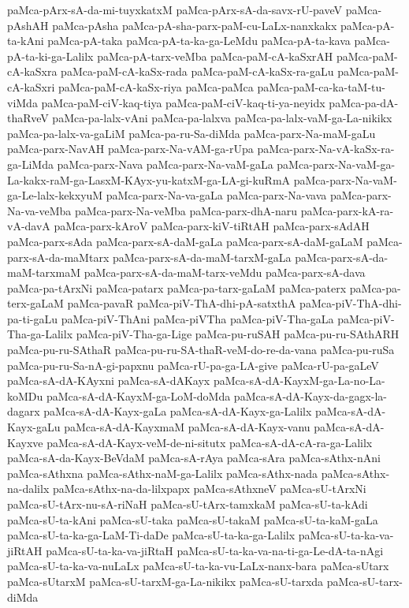 {paMca-pArx-sA-da-mi-tuyxkatxM
paMca-pArx-sA-da-savx-rU-paveV
paMca-pAshAH
paMca-pAsha
paMca-pA-sha-parx-paM-cu-LaLx-nanxkakx
paMca-pA-ta-kAni
paMca-pA-taka
paMca-pA-ta-ka-ga-LeMdu
paMca-pA-ta-kava
paMca-pA-ta-ki-ga-Lalilx
paMca-pA-tarx-veMba
paMca-paM-cA-kaSxrAH
paMca-paM-cA-kaSxra
paMca-paM-cA-kaSx-rada
paMca-paM-cA-kaSx-ra-gaLu
paMca-paM-cA-kaSxri
paMca-paM-cA-kaSx-riya
paMca-paMca
paMca-paM-ca-ka-taM-tu-viMda
paMca-paM-ciV-kaq-tiya
paMca-paM-ciV-kaq-ti-ya-neyidx
paMca-pa-dA-thaRveV
paMca-pa-lalx-vAni
paMca-pa-lalxva
paMca-pa-lalx-vaM-ga-La-nikikx
paMca-pa-lalx-va-gaLiM
paMca-pa-ru-Sa-diMda
paMca-parx-Na-maM-gaLu
paMca-parx-NavAH
paMca-parx-Na-vAM-ga-rUpa
paMca-parx-Na-vA-kaSx-ra-ga-LiMda
paMca-parx-Nava
paMca-parx-Na-vaM-gaLa
paMca-parx-Na-vaM-ga-La-kakx-raM-ga-LasxM-KAyx-yu-katxM-ga-LA-gi-kuRmA
paMca-parx-Na-vaM-ga-Le-lalx-kekxyuM
paMca-parx-Na-va-gaLa
paMca-parx-Na-vava
paMca-parx-Na-va-veMba
paMca-parx-Na-veMba
paMca-parx-dhA-naru
paMca-parx-kA-ra-vA-davA
paMca-parx-kAroV
paMca-parx-kiV-tiRtAH
paMca-parx-sAdAH
paMca-parx-sAda
paMca-parx-sA-daM-gaLa
paMca-parx-sA-daM-gaLaM
paMca-parx-sA-da-maMtarx
paMca-parx-sA-da-maM-tarxM-gaLa
paMca-parx-sA-da-maM-tarxmaM
paMca-parx-sA-da-maM-tarx-veMdu
paMca-parx-sA-dava
paMca-pa-tArxNi
paMca-patarx
paMca-pa-tarx-gaLaM
paMca-paterx
paMca-pa-terx-gaLaM
paMca-pavaR
paMca-piV-ThA-dhi-pA-satxthA
paMca-piV-ThA-dhi-pa-ti-gaLu
paMca-piV-ThAni
paMca-piVTha
paMca-piV-Tha-gaLa
paMca-piV-Tha-ga-Lalilx
paMca-piV-Tha-ga-Lige
paMca-pu-ruSAH
paMca-pu-ru-SAthARH
paMca-pu-ru-SAthaR
paMca-pu-ru-SA-thaR-veM-do-re-da-vana
paMca-pu-ruSa
paMca-pu-ru-Sa-nA-gi-papxnu
paMca-rU-pa-ga-LA-give
paMca-rU-pa-gaLeV
paMca-sA-dA-KAyxni
paMca-sA-dAKayx
paMca-sA-dA-KayxM-ga-La-no-La-koMDu
paMca-sA-dA-KayxM-ga-LoM-doMda
paMca-sA-dA-Kayx-da-gagx-la-dagarx
paMca-sA-dA-Kayx-gaLa
paMca-sA-dA-Kayx-ga-Lalilx
paMca-sA-dA-Kayx-gaLu
paMca-sA-dA-KayxmaM
paMca-sA-dA-Kayx-vanu
paMca-sA-dA-Kayxve
paMca-sA-dA-Kayx-veM-de-ni-situtx
paMca-sA-dA-cA-ra-ga-Lalilx
paMca-sA-da-Kayx-BeVdaM
paMca-sA-rAya
paMca-sAra
paMca-sAthx-nAni
paMca-sAthxna
paMca-sAthx-naM-ga-Lalilx
paMca-sAthx-nada
paMca-sAthx-na-dalilx
paMca-sAthx-na-da-lilxpapx
paMca-sAthxneV
paMca-sU-tArxNi
paMca-sU-tArx-nu-sA-riNaH
paMca-sU-tArx-tamxkaM
paMca-sU-ta-kAdi
paMca-sU-ta-kAni
paMca-sU-taka
paMca-sU-takaM
paMca-sU-ta-kaM-gaLa
paMca-sU-ta-ka-ga-LaM-Ti-daDe
paMca-sU-ta-ka-ga-Lalilx
paMca-sU-ta-ka-va-jiRtAH
paMca-sU-ta-ka-va-jiRtaH
paMca-sU-ta-ka-va-na-ti-ga-Le-dA-ta-nAgi
paMca-sU-ta-ka-va-nuLaLx
paMca-sU-ta-ka-vu-LaLx-nanx-bara
paMca-sUtarx
paMca-sUtarxM
paMca-sU-tarxM-ga-La-nikikx
paMca-sU-tarxda
paMca-sU-tarx-diMda
}
